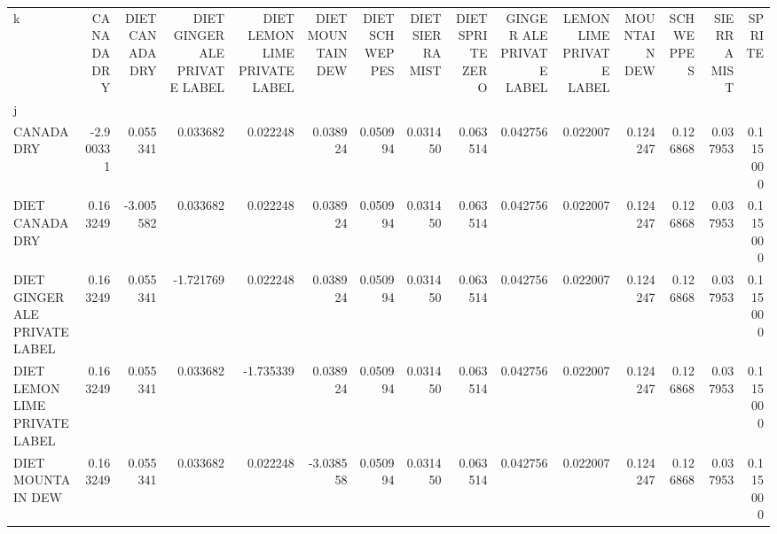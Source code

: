 \begin{tabular}{lrrrrrrrrrrrrrr}
\toprule
k &  CANADA DRY &  DIET CANADA DRY &  DIET GINGER ALE PRIVATE LABEL &  DIET LEMON LIME PRIVATE LABEL &  DIET MOUNTAIN DEW &  DIET SCHWEPPES &  DIET SIERRA MIST &  DIET SPRITE ZERO &  GINGER ALE PRIVATE LABEL &  LEMON LIME PRIVATE LABEL &  MOUNTAIN DEW &  SCHWEPPES &  SIERRA MIST &    SPRITE \\
j                             &             &                  &                                &                                &                    &                 &                   &                   &                           &                           &               &            &              &           \\
\midrule
CANADA DRY                    &   -2.900331 &         0.055341 &                       0.033682 &                       0.022248 &           0.038924 &        0.050994 &          0.031450 &          0.063514 &                  0.042756 &                  0.022007 &      0.124247 &   0.126868 &     0.037953 &  0.115000 \\
DIET CANADA DRY               &    0.163249 &        -3.005582 &                       0.033682 &                       0.022248 &           0.038924 &        0.050994 &          0.031450 &          0.063514 &                  0.042756 &                  0.022007 &      0.124247 &   0.126868 &     0.037953 &  0.115000 \\
DIET GINGER ALE PRIVATE LABEL &    0.163249 &         0.055341 &                      -1.721769 &                       0.022248 &           0.038924 &        0.050994 &          0.031450 &          0.063514 &                  0.042756 &                  0.022007 &      0.124247 &   0.126868 &     0.037953 &  0.115000 \\
DIET LEMON LIME PRIVATE LABEL &    0.163249 &         0.055341 &                       0.033682 &                      -1.735339 &           0.038924 &        0.050994 &          0.031450 &          0.063514 &                  0.042756 &                  0.022007 &      0.124247 &   0.126868 &     0.037953 &  0.115000 \\
DIET MOUNTAIN DEW             &    0.163249 &         0.055341 &                       0.033682 &                       0.022248 &          -3.038558 &        0.050994 &          0.031450 &          0.063514 &                  0.042756 &                  0.022007 &      0.124247 &   0.126868 &     0.037953 &  0.115000 \\

\end{tabular}
